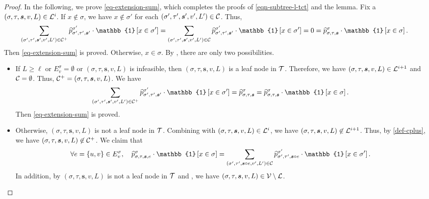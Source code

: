 \documentclass[11pt]{article}
\newcommand{\set}[1]{\left\{#1\right\}}
\newcommand{\id}[1]{\mathbb{1}\left[#1\right]}
\newcommand{\seqS}{\boldsymbol{s}}
\begin{document}
\begin{proof}
    In the following, we prove \eqref{eq-extension-sum}, which completes the proofs of \eqref{eqn-subtree-l-tct} and the lemma. Fix a $(\sigma,\tau,\seqS,v,L)\in \+L^i$.  
    If $x\not \in \sigma$, we have $x\not\in \sigma'$ for each $(\sigma',\tau',\seqS',v',L')\in \+C$.
    Thus, 
    \begin{align*}
    \sum_{(\sigma',\tau', \seqS',v',L')\in \+C^{+} } \widehat{p}^{\sigma'}_{\sigma',\tau',\seqS'}\cdot \id{x\in \sigma'}=\sum_{(\sigma',\tau', \seqS',v',L')\in \+C} \widehat{p}^{\sigma'}_{\sigma',\tau',\seqS'}\cdot\id{ x\in \sigma'} =0 = \widehat{p}^{\sigma}_{\sigma,\tau,\seqS}\cdot \id{x \in \sigma}.
    \end{align*}
    Then \eqref{eq-extension-sum} is proved.
    Otherwise, $x \in \sigma$.     
    By ,
    there are only two possibilities.
    \begin{itemize}
    \item If $L\geq \ell$ or $E_v^{\sigma}=\emptyset$ or $(\sigma, \tau, \seqS, v, L)$ is infeasible, then $(\sigma,\tau,\seqS,v,L)$ is a leaf node in $\mathcal{T}$.
    Therefore, we have $(\sigma,\tau,\seqS,v,L)\in \+L^{i+1}$ and $\mathcal{C} = \emptyset$.
    Thus, $\+C^+ = (\sigma, \tau, \seqS, v, L)$.
    We have 
    \begin{align*}
    \sum_{(\sigma',\tau', \seqS',v',L')\in \+C^{+}} \widehat{p}^{\sigma'}_{\sigma',\tau',\seqS'}\cdot \id{x\in \sigma'} = \widehat{p}^{\sigma}_{\sigma,\tau,\seqS} = \widehat{p}^{\sigma}_{\sigma,\tau,\seqS}\cdot \id{x \in \sigma}.
    \end{align*}
    Then \eqref{eq-extension-sum} is proved.    
    \item Otherwise, $(\sigma,\tau,\seqS,v,L)$ is not a leaf node in $\mathcal{T}$. Combining with $(\sigma,\tau,\seqS,v,L) \in \+L^{i}$, we have 
    $(\sigma,\tau,\seqS,v,L)\\ \not\in \+L^{i+1}$.
    Thus, by \eqref{def-cplus}, we have $(\sigma,\tau,\seqS,v,L) \not\in \+C^{+}$.
    We claim that 
    \begin{align}\label{eq-extension-sum-edge}
     \forall e = \set{u,v} \in E_v^{\sigma}, \quad \widehat{p}^{\sigma}_{\sigma,\tau,\seqS,e}\cdot \id{x \in \sigma} = \sum_{(\sigma',\tau', \seqS\circ e,v',L')\in \+C } \widehat{p}^{\sigma'}_{\sigma',\tau',\seqS\circ e}\cdot \id{x\in \sigma'}.
    \end{align}
    In addition, by $(\sigma,\tau,\seqS,v,L)$ is not a leaf node in $\mathcal{T}$ and , we have 
    $(\sigma,\tau,\seqS,v,L)\in \+V\setminus \+L$.

\end{itemize}
\end{proof}
\end{document}
